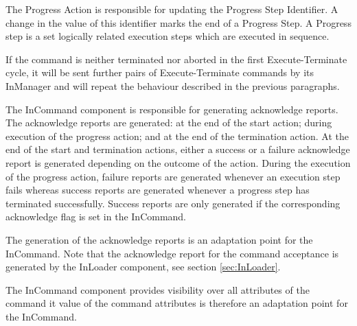 The Progress Action is responsible for updating the Progress Step Identifier. A change in the value of this identifier marks the end of a Progress Step. A Progress step is a set logically related execution steps which are executed in sequence.

If the command is neither terminated nor aborted in the first Execute-Terminate cycle, it will be sent further pairs of Execute-Terminate commands by its InManager and will repeat the behaviour described in the previous paragraphs.  

The InCommand component is responsible for generating acknowledge reports. The acknowledge reports are generated: at the end of the start action; during execution of the progress action; and at the end of the termination action. At the end of the start and termination actions, either a success or a failure acknowledge report is generated depending on the outcome of the action. During the execution of the progress action, failure reports are generated whenever an execution step fails whereas success reports are generated whenever a progress step has terminated successfully. Success reports are only generated if the corresponding acknowledge flag is set in the InCommand. 

The generation of the acknowledge reports is an adaptation point for the InCommand. Note that the acknowledge report for the command acceptance is generated by the InLoader component, see section \ref{sec:InLoader}.

The InCommand component provides visibility over all attributes of the command it  value of the command attributes is therefore an adaptation point for the InCommand.


